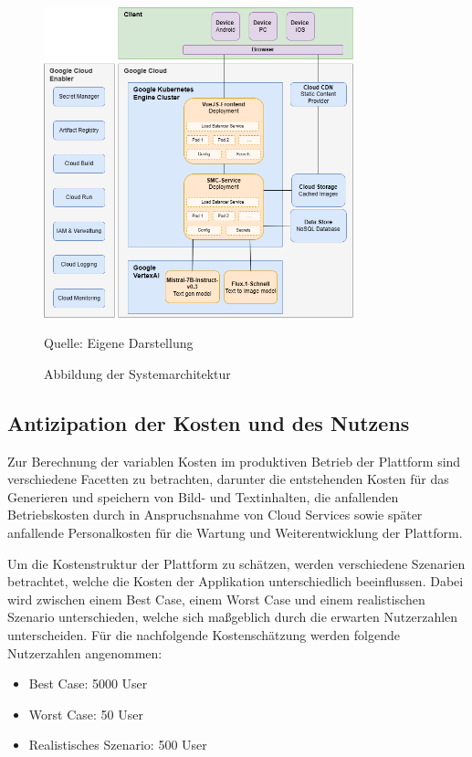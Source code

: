 \begin{figure}[htbp]
    \includegraphics[width=0.8\textwidth]{abbildungen/Drawio/SystemArchitektur}
    \caption{Abbildung der Systemarchitektur}
    \label{fig:sytem-architektur}
    \vspace{0.5cm}
    \raggedright Quelle: Eigene Darstellung
\end{figure}

\subsection{Antizipation der Kosten und des Nutzens}

Zur Berechnung der variablen Kosten im produktiven Betrieb der Plattform sind verschiedene Facetten zu betrachten, darunter die entstehenden Kosten für das Generieren und
speichern von Bild- und Textinhalten, die anfallenden Betriebskosten durch in Anspruchsnahme von Cloud Services sowie später anfallende Personalkosten für die Wartung und Weiterentwicklung der Plattform.

Um die Kostenstruktur der Plattform zu schätzen, werden verschiedene Szenarien betrachtet, welche die Kosten der Applikation unterschiedlich beeinflussen.
Dabei wird zwischen einem Best Case, einem Worst Case und einem realistischen Szenario unterschieden, welche sich maßgeblich durch die erwarten Nutzerzahlen unterscheiden.
Für die nachfolgende Kostenschätzung werden folgende Nutzerzahlen angenommen:

\begin{itemize}
    \item Best Case: 5000 User
    \item Worst Case: 50 User
    \item Realistisches Szenario: 500 User
\end{itemize}

